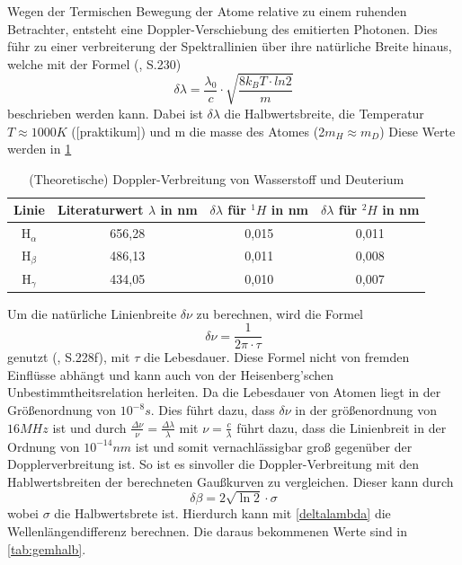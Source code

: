 Wegen der Termischen Bewegung der Atome relative zu einem ruhenden Betrachter, entsteht eine Doppler-Verschiebung des emitierten Photonen. 
Dies führ zu einer verbreiterung der Spektrallinien über ihre natürliche Breite hinaus, welche mit der Formel (\cite{Demtröder_Ex3}, S.230)
\begin{equation}
    \delta\lambda = \frac{\lambda_0}{c}\cdot \sqrt{\frac{8k_BT\cdot ln2}{m}}
\end{equation}
beschrieben werden kann.
Dabei ist $\delta\lambda$ die Halbwertsbreite, die Temperatur $T \approx 1000K$ ([praktikum]) und m die masse des Atomes (2$m_H \approx m_D$)
Diese Werte werden in \cref{tab:dopplerTemp}
\begin{table}[htbp]
    \centering
    \begin{tabular}{|c|c|c|c|}
    \hline
    Linie & Literaturwert $\lambda$ in nm & $\delta\lambda$ für $^1H$ in nm & $\delta\lambda$ für $^2H$ in nm \\
    \midrule
    H$_\alpha$ & 656,28 & 0,015 & 0,011 \\
    H$_\beta$ & 486,13 & 0,011 & 0,008 \\
    H$_\gamma$  & 434,05 & 0,010 & 0,007 \\
    \hline
    \end{tabular}
    \caption{(Theoretische) Doppler-Verbreitung von Wasserstoff und Deuterium}
    \label{tab:dopplerTemp}
\end{table}

Um die natürliche Linienbreite $\delta\nu$ zu berechnen, wird die Formel
\begin{equation}
    \delta \nu = \frac{1}{2\pi \cdot \tau}
\end{equation}
genutzt (\cite{Demtröder_Ex3}, S.228f), mit $\tau$ die Lebesdauer. 
Diese Formel nicht von fremden Einflüsse abhängt und kann auch von der Heisenberg'schen Unbestimmtheitsrelation herleiten.  
Da die Lebesdauer von Atomen liegt in der Größenordnung von $10^{-8}s$. 
Dies führt dazu, dass $\delta\nu$ in der größenordnung von $16MHz$  ist und durch $\frac{\Delta\nu}{\nu} = \frac{\Delta\lambda}{\lambda}$ mit $\nu = \frac{c}{\lambda}$ führt dazu, dass die Linienbreit in der Ordnung von $10^{-14}nm$ ist und somit vernachlässigbar groß gegenüber der Dopplerverbreitung ist.
So ist es sinvoller die Doppler-Verbreitung mit den Hablwertsbreiten der berechneten Gaußkurven zu vergleichen.
Dieser kann durch 
\begin{equation}
    \delta\beta = 2\sqrt{\ln{2}}\cdot \sigma
\end{equation}
wobei $\sigma$ die Halbwertsbrete ist.
Hierdurch kann mit \cref{deltalambda} die Wellenlängendifferenz berechnen.
Die daraus bekommenen Werte sind in \cref{tab:gemhalb}.

